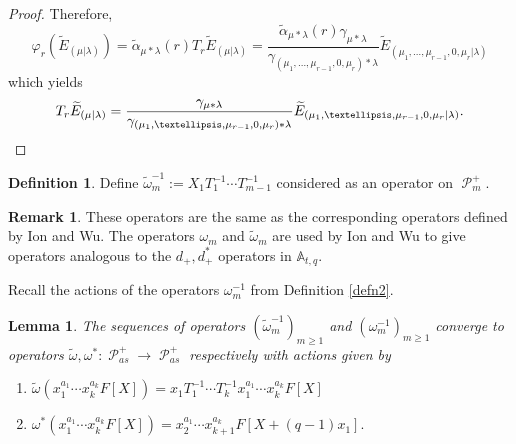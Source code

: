 \documentclass[11pt]{article}
\newtheorem{lemm}[theo]{Lemma}
\theoremstyle{definition}
\newtheorem{defi}[theo]{Definition}
\newtheorem{rema}[theo]{Remark}
\numberwithin{equation}{section}
\DeclareMathOperator{\sP}{\mathscr{P} }
\begin{document}
\begin{proof}
Therefore, 
$$\varphi_{r}(\widetilde{E}_{(\mu|\lambda)}) = \widetilde{\alpha}_{\mu*\lambda}(r) T_r \widetilde{E}_{(\mu|\lambda)} = \frac{\widetilde{\alpha}_{\mu*\lambda}(r)\gamma_{\mu*\lambda}}{\gamma_{(\mu_1,\ldots,\mu_{r-1},0,\mu_r)*\lambda}} \widetilde{E}_{(\mu_1,\ldots,\mu_{r-1},0,\mu_r|\lambda)}$$ which yields 
$$T_r\widetilde{E}_{(\mu|\lambda)} = \frac{\gamma_{\mu*\lambda}}{\gamma_{(\mu_1,\ldots,\mu_{r-1},0,\mu_r)*\lambda}} \widetilde{E}_{(\mu_1,\ldots,\mu_{r-1},0,\mu_r|\lambda)}. \qedhere$$
\end{proof}

\begin{defi}\label{defn 10}
 Define $\widetilde{\omega}_m^{-1} := X_1T_1^{-1}\cdots T_{m-1}^{-1}$ considered as an operator on $\sP_{m}^{+}$.
\end{defi}

\begin{rema}
    These operators are the same as the corresponding operators defined by Ion and Wu. The operators $\omega_m$ and $\widetilde{\omega}_m$ are used by Ion and Wu \cite{Ion_2022} to give operators analogous to the $d_{+},d_{+}^{*}$ operators in $\mathbb{A}_{t,q}$.
\end{rema}

Recall the actions of the operators $\omega_{m}^{-1}$ from Definition \ref{defn2}.

\begin{lemm}\label{pis converges}
    The sequences of operators $(\widetilde{\omega}_m^{-1})_{m\geq 1}$ and $(\omega_{m}^{-1})_{m \geq 1}$ converge to operators $\widetilde{\omega}, \omega^{*}: \sP_{as}^{+} \rightarrow \sP_{as}^{+}$ respectively with actions given by 
    \begin{enumerate}
        \item $\widetilde{\omega}(x_1^{a_1}\cdots x_k^{a_k}F[X]) = x_1T_1^{-1}\cdots T_{k}^{-1}x_1^{a_1}\cdots x_k^{a_k}F[X]$ \label{tilde omega action}
        \item $\omega^{*}(x_1^{a_1}\cdots x_k^{a_k}F[X]) = x_2^{a_1}\cdots x_{k+1}^{a_k}F[X+(q-1)x_1].$
    \end{enumerate}

    
\end{lemm}
\end{document}

